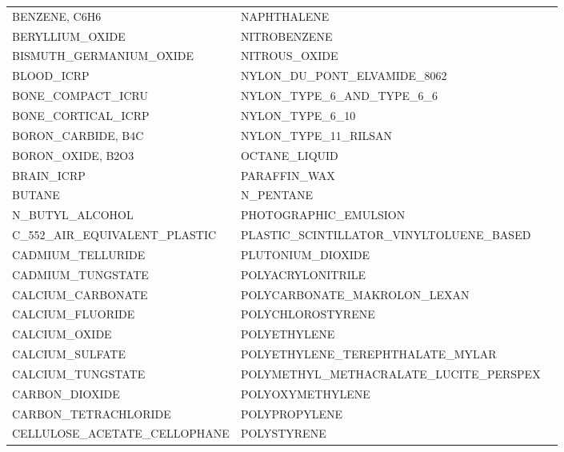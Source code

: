 \begin{center}
\begin{longtable}{lll}
BENZENE, C6H6                       & NAPHTHALENE                               \\
BERYLLIUM_OXIDE                     & NITROBENZENE                              \\
BISMUTH_GERMANIUM_OXIDE             & NITROUS_OXIDE                             \\
BLOOD_ICRP                          & NYLON_DU_PONT_ELVAMIDE_8062               \\
BONE_COMPACT_ICRU                   & NYLON_TYPE_6_AND_TYPE_6_6                 \\
BONE_CORTICAL_ICRP                  & NYLON_TYPE_6_10                           \\
BORON_CARBIDE, B4C                  & NYLON_TYPE_11_RILSAN                      \\
BORON_OXIDE, B2O3                   & OCTANE_LIQUID                             \\
BRAIN_ICRP                          & PARAFFIN_WAX                              \\
BUTANE                              & N_PENTANE                                 \\
N_BUTYL_ALCOHOL                     & PHOTOGRAPHIC_EMULSION                     \\
C_552_AIR_EQUIVALENT_PLASTIC        & PLASTIC_SCINTILLATOR_VINYLTOLUENE_BASED   \\
CADMIUM_TELLURIDE                   & PLUTONIUM_DIOXIDE                         \\
CADMIUM_TUNGSTATE                   & POLYACRYLONITRILE                         \\
CALCIUM_CARBONATE                   & POLYCARBONATE_MAKROLON_LEXAN              \\
CALCIUM_FLUORIDE                    & POLYCHLOROSTYRENE                         \\
CALCIUM_OXIDE                       & POLYETHYLENE                              \\
CALCIUM_SULFATE                     & POLYETHYLENE_TEREPHTHALATE_MYLAR          \\
CALCIUM_TUNGSTATE                   & POLYMETHYL_METHACRALATE_LUCITE_PERSPEX    \\
CARBON_DIOXIDE                      & POLYOXYMETHYLENE                          \\
CARBON_TETRACHLORIDE                & POLYPROPYLENE                             \\
CELLULOSE_ACETATE_CELLOPHANE        & POLYSTYRENE                               \\

\end{longtable}
\end{center}
